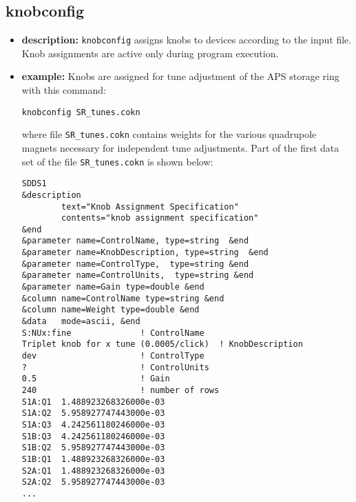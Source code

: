 %
%
\begin{latexonly}
\newpage
\end{latexonly}
%
%
\subsection{knobconfig}
\label{knobconfig}

\begin{itemize}
\item {\bf description:}
%
%
\verb+knobconfig+ assigns knobs to devices
according to the input file. Knob assignments are active
only during program execution.
\item {\bf example:} 
%
% 
%
Knobs are assigned for tune adjustment of the APS storage ring with this
command:
\begin{verbatim}
knobconfig SR_tunes.cokn
\end{verbatim}
where file \verb+SR_tunes.cokn+ contains weights for the various
quadrupole magnets necessary for independent tune adjustments.
Part of the first data set of the file \verb+SR_tunes.cokn+
is shown below:
\begin{verbatim}
SDDS1
&description 
        text="Knob Assignment Specification" 
        contents="knob assignment specification" 
&end 
&parameter name=ControlName, type=string  &end 
&parameter name=KnobDescription, type=string  &end
&parameter name=ControlType,  type=string &end 
&parameter name=ControlUnits,  type=string &end 
&parameter name=Gain type=double &end 
&column name=ControlName type=string &end 
&column name=Weight type=double &end 
&data   mode=ascii, &end 
S:NUx:fine              ! ControlName
Triplet knob for x tune (0.0005/click)  ! KnobDescription
dev                     ! ControlType
?                       ! ControlUnits
0.5                     ! Gain
240                     ! number of rows
S1A:Q1  1.488923268326000e-03
S1A:Q2  5.958927747443000e-03
S1A:Q3  4.242561180246000e-03
S1B:Q3  4.242561180246000e-03
S1B:Q2  5.958927747443000e-03
S1B:Q1  1.488923268326000e-03
S2A:Q1  1.488923268326000e-03
S2A:Q2  5.958927747443000e-03
...
\end{verbatim}


\end{itemize}
